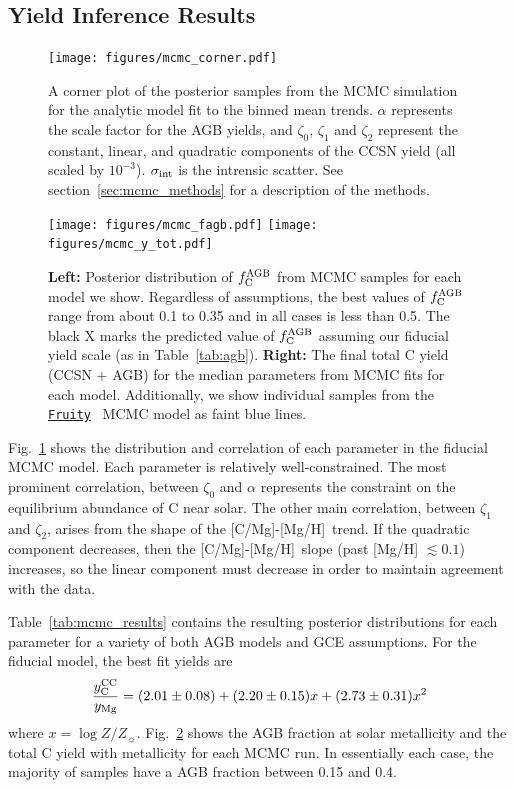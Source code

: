 \documentclass[fleqn,
usenatbib]{mnras}
\newcommand{\fruity}{\texttt{\hyperlink{fruity}{Fruity}}}
\newcommand{\caah}{[C/Mg]-[Mg/H]}
\newcommand{\Ycc}{{y_{\rm C}^{\rm CC}}}
\newcommand{\fagb}{f_{\rm C}^{\rm AGB}}
\newcommand{\zetao}{\zeta_0}
\newcommand{\zetai}{\zeta_{1}}
\newcommand{\zetaii}{\zeta_{2}}
\newcommand{\Zo}{ Z_{\sun}}
\begin{document}
\subsection{Yield Inference Results} \label{sec:mcmc_results}


\begin{figure}
\centering
\texttt{[image: figures/mcmc\_corner.pdf]}
\caption[]{
A corner plot of the posterior samples from the MCMC simulation for the analytic model fit to the binned mean trends.
$\alpha$ represents the scale factor for the AGB yields, and $\zetao$, $\zetai$ and $\zetaii$ represent the constant, linear, and quadratic components of the CCSN yield (all scaled by $10^{-3}$). $\sigma_{\rm int}$ is the intrensic scatter.
See section~\ref{sec:mcmc_methods} for a description of the methods.
}

\label{fig:mcmc}
\end{figure}


\begin{figure}
    \centering
    \texttt{[image: figures/mcmc\_fagb.pdf]}
    \texttt{[image: figures/mcmc\_y\_tot.pdf]}
    
    \caption[]{
        \textbf{Left:} Posterior distribution of $\fagb$ from MCMC samples for each model we show. Regardless of assumptions, the best values of $\fagb$ range from about 0.1 to 0.35 and in all cases is less than 0.5. The black X marks the predicted value of $\fagb$ assuming our fiducial yield scale (as in Table~\ref{tab:agb}).
    \textbf{Right:} The final total C yield (CCSN + AGB) for the median parameters from MCMC fits for each model. Additionally, we show individual samples from the \fruity{} \ MCMC model as faint blue lines.
    }
    
    \label{fig:mcmc_ytot}
\end{figure}



Fig.~\ref{fig:mcmc} shows the distribution and correlation of each parameter in the fiducial MCMC model. Each parameter is relatively well-constrained. The most prominent correlation, between $\zetao$ and $\alpha$ represents the constraint on the equilibrium abundance of C near solar. The other main correlation, between $\zetai$ and $\zetaii$, arises from the shape of the \caah\ trend. If the quadratic component decreases, then the \caah\  slope (past [Mg/H] $\lesssim 0.1$) increases, so the linear component must decrease in order to maintain agreement with the data.

Table~\ref{tab:mcmc_results} contains the resulting posterior distributions for each parameter for a variety of both AGB models and GCE assumptions. 
For the fiducial model, the best fit yields are 
\begin{equation}
    \frac{\Ycc}{y_{\rm Mg}} = (2.01\pm  0.08) + (2.20 \pm 0.15) x + (2.73 \pm 0.31) x^2
\end{equation}
where $x = \log Z/\Zo$.
Fig.~\ref{fig:mcmc_ytot} shows the AGB fraction at solar metallicity and the total C yield with metallicity for each MCMC run. 
In essentially each case, the majority of samples have a AGB fraction between 0.15 and 0.4. 
\end{document}
